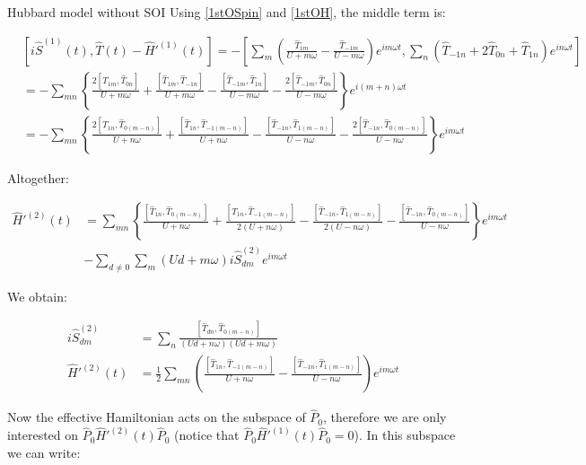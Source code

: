 \begin{section}{Hubbard model without SOI}
Using \ref{1stOSpin} and \ref{1stOH}, the middle term is:

\begin{align*}
&\left[ i\hat{S}^{(1)}(t), \hat{T}(t) - \hat{H}'^{(1)}(t)\right] = -\left[\sum_m \left( \frac{\hat{T}_{1m}}{U+m\omega} - \frac{\hat{T}_{-1m}}{U-m\omega} \right)e^{im \omega t}, \sum_n \left( \hat{T}_{-1n} + 2\hat{T}_{0n} + \hat{T}_{1n} \right) e^{in\omega t} \right] \\
&= -\sum_{mn} \left\{ \frac{2\left[\hat{T}_{1m}, \hat{T}_{0n} \right]}{U+m\omega} + \frac{\left[\hat{T}_{1m}, \hat{T}_{-1n} \right]}{U+m\omega} - \frac{\left[\hat{T}_{-1m}, \hat{T}_{1n} \right]}{U-m\omega} - \frac{2\left[\hat{T}_{-1m}, \hat{T}_{0n} \right]}{U-m\omega} \right\} e^{i(m+n)\omega t} \\
&= -\sum_{mn} \left\{ \frac{2\left[\hat{T}_{1n}, \hat{T}_{0(m-n)} \right]}{U+n\omega} + \frac{\left[\hat{T}_{1n}, \hat{T}_{-1(m-n)} \right]}{U+n\omega} - \frac{\left[\hat{T}_{-1n}, \hat{T}_{1(m-n)} \right]}{U-n\omega} - \frac{2\left[\hat{T}_{-1n}, \hat{T}_{0(m-n)} \right]}{U-n\omega} \right\} e^{im\omega t}
\end{align*}

Altogether:

\begin{align*}
\hat{H}'^{(2)}(t) &= \sum_{mn} \left\{ \frac{\left[\hat{T}_{1n}, \hat{T}_{0(m-n)} \right]}{U+n\omega} + \frac{\left[\hat{T}_{1n}, \hat{T}_{-1(m-n)} \right]}{2(U+n\omega)} - \frac{\left[\hat{T}_{-1n}, \hat{T}_{1(m-n)} \right]}{2(U-n\omega)} - \frac{\left[\hat{T}_{-1n}, \hat{T}_{0(m-n)} \right]}{U-n\omega} \right\} e^{im\omega t} \\
&-\sum_{d\neq 0}\sum_m (Ud+m\omega) i\hat{S}^{(2)}_{dm} e^{im\omega t}
\end{align*}

We obtain:

\begin{align}
i\hat{S}^{(2)}_{dm} &= \sum_n \frac{\left[ \hat{T}_{dn}, \hat{T}_{0(m-n)} \right]}{(Ud+n\omega)(Ud+m\omega)} \label{2ndOSpin}\\
\hat{H}'^{(2)}(t) &= \frac{1}{2}\sum_{mn} \left( \frac{\left[\hat{T}_{1n}, \hat{T}_{-1(m-n)} \right]}{U+n\omega} - \frac{\left[\hat{T}_{-1n}, \hat{T}_{1(m-n)} \right]}{U-n\omega} \right) e^{im\omega t} \label{2ndOH}
\end{align}

Now the effective Hamiltonian acts on the subspace of $\hat{P}_0$, therefore we are only interested on $\hat{P}_0 \hat{H}'^{(2)}(t) \hat{P}_0$ (notice that $\hat{P}_0 \hat{H}'^{(1)}(t) \hat{P}_0 = 0$). In this subspace we can write:


\end{section}
